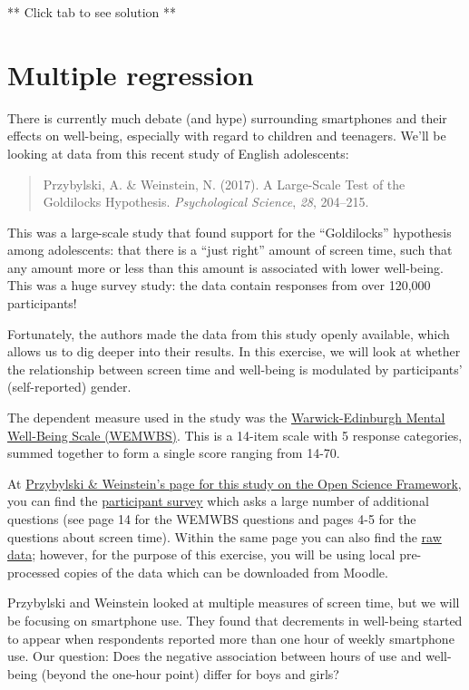 \documentclass[]{book}
\begin{document}
** Click tab to see solution **

\hypertarget{multiple-regression}{%
\chapter{Multiple regression}\label{multiple-regression}}

There is currently much debate (and hype) surrounding smartphones and their effects on well-being, especially with regard to children and teenagers. We'll be looking at data from this recent study of English adolescents:

\begin{quote}
Przybylski, A. \& Weinstein, N. (2017). A Large-Scale Test of the Goldilocks Hypothesis. \emph{Psychological Science}, \emph{28}, 204--215.
\end{quote}

This was a large-scale study that found support for the ``Goldilocks'' hypothesis among adolescents: that there is a ``just right'' amount of screen time, such that any amount more or less than this amount is associated with lower well-being. This was a huge survey study: the data contain responses from over 120,000 participants!

Fortunately, the authors made the data from this study openly available, which allows us to dig deeper into their results. In this exercise, we will look at whether the relationship between screen time and well-being is modulated by participants' (self-reported) gender.

The dependent measure used in the study was the \href{https://warwick.ac.uk/fac/med/research/platform/wemwbs/}{Warwick-Edinburgh Mental Well-Being Scale (WEMWBS)}. This is a 14-item scale with 5 response categories, summed together to form a single score ranging from 14-70.

At \href{https://osf.io/82ybd/}{Przybylski \& Weinstein's page for this study on the Open Science Framework}, you can find the \href{https://osf.io/82ybd/}{participant survey} which asks a large number of additional questions (see page 14 for the WEMWBS questions and pages 4-5 for the questions about screen time). Within the same page you can also find the \href{https://osf.io/82ybd/}{raw data}; however, for the purpose of this exercise, you will be using local pre-processed copies of the data which can be downloaded from Moodle.

Przybylski and Weinstein looked at multiple measures of screen time, but we will be focusing on smartphone use. They found that decrements in well-being started to appear when respondents reported more than one hour of weekly smartphone use. Our question: Does the negative association between hours of use and well-being (beyond the one-hour point) differ for boys and girls?
\end{document}
